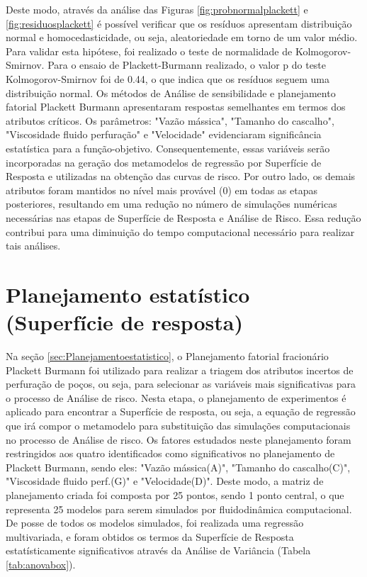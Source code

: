 Deste modo, através da análise das Figuras \ref{fig:probnormalplackett} e \ref{fig:residuosplackett} é possível verificar que os resíduos apresentam distribuição normal e homocedasticidade, ou seja, aleatoriedade em torno de um valor médio. Para validar esta hipótese, foi realizado o teste de normalidade de Kolmogorov-Smirnov. Para o ensaio de Plackett-Burmann realizado, o valor p do teste Kolmogorov-Smirnov foi de 0.44, o que indica que os resíduos seguem uma distribuição normal. Os métodos de Análise de sensibilidade e planejamento fatorial Plackett Burmann apresentaram respostas semelhantes em termos dos atributos críticos. Os parâmetros: "Vazão mássica", "Tamanho do cascalho", "Viscosidade fluido perfuração" e "Velocidade" evidenciaram significância estatística para a função-objetivo. Consequentemente, essas variáveis serão incorporadas na geração dos metamodelos de regressão por Superfície de Resposta e utilizadas na obtenção das curvas de risco. Por outro lado, os demais atributos foram mantidos no nível mais provável (0) em todas as etapas posteriores, resultando em uma redução no número de simulações numéricas necessárias nas etapas de Superfície de Resposta e Análise de Risco. Essa redução contribui para uma diminuição do tempo computacional necessário para realizar tais análises.


\section{Planejamento estatístico (Superfície de resposta)}

Na seção \ref{sec:Planejamentoestatistico}, o Planejamento fatorial fracionário Plackett Burmann foi utilizado para realizar a triagem dos atributos incertos de perfuração de poços, ou seja, para selecionar as variáveis mais significativas para o processo de Análise de risco. Nesta etapa, o planejamento de experimentos é aplicado para encontrar a Superfície de resposta, ou seja, a equação de regressão que irá compor o metamodelo para substituição das simulações computacionais no processo de Análise de risco. Os fatores estudados neste planejamento foram restringidos aos quatro identificados como significativos no planejamento de Plackett Burmann, sendo eles: "Vazão mássica(A)", "Tamanho do cascalho(C)", "Viscosidade fluido perf.(G)" e "Velocidade(D)". Deste modo, a matriz de planejamento criada foi composta por 25 pontos, sendo 1 ponto central, o que representa 25 modelos para serem simulados por fluidodinâmica computacional. De posse de todos os modelos simulados, foi realizada uma regressão multivariada, e foram obtidos os termos da Superfície de Resposta estatísticamente significativos através da Análise de Variância (Tabela \ref{tab:anovabox}).

